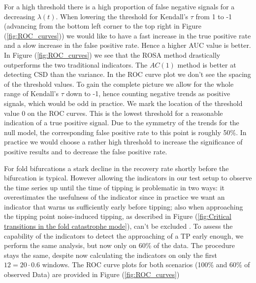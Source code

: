 \documentclass[%
thesis=student,%
coverpage=false,%
titlepage=false,%
headmarks=true, %
english,%
font=libertine, %
math=newpxtx, %
BCOR=5mm,%
coverBCOR=11mm%
]{tumbook}
\begin{document}
For a high threshold there is a high proportion of false negative signals for a decreasing $\lambda(t)$. When lowering the threshold for Kendall's $\tau$ from 1 to -1 (advancing from the bottom left corner to the top right in Figure (\ref{fig:ROC_curves})) we would like to have a fast increase in the true positive rate and a slow increase in the false positive rate. Hence a higher AUC value is better. In Figure (\ref{fig:ROC_curves}) we see that the ROSA method drastically outperforms the two traditional indicators. The $AC(1)$ method is better at detecting CSD than the variance.  
In the ROC curve plot we don't see the spacing of the threshold values. To gain the complete picture we allow for the whole range of Kendall's $\tau$ down to -1, hence counting negative trends as positive signals, which would be odd in practice. We mark the location of the threshold value 0 on the ROC curves. This is the lowest threshold for a reasonable indication of a true positive signal. Due to the symmetry of the trends for the null model, the corresponding false positive rate to this point is roughly 50\%. In practice we would choose a rather high threshold to increase the significance of positive results and to decrease the false positive rate.

For fold bifurcations a stark decline in the recovery rate shortly before the bifurcation is typical. However allowing the indicators in our test setup to observe the time series up until the time of tipping is problematic in two ways: it overestimates the usefulness of the indicator since in practice we want an indicator that warns us sufficiently early before tipping; also when approaching the tipping point noise-induced tipping, as described in Figure (\ref{fig:Critical transitions in the fold catastrophe mode}), can't be excluded \cite{Ashwin:2012,Meng:2020}. To assess the capability of the indicators to detect the approaching of a TP early enough, we perform the same analysis, but now only on 60\% of the data. The procedure stays the same, despite now calculating the indicators on only the first $12 = 20 \cdot 0.6$ windows. The ROC curve plots for both scenarios (100\% and 60\% of observed Data) are provided in Figure (\ref{fig:ROC_curves})
\end{document}
